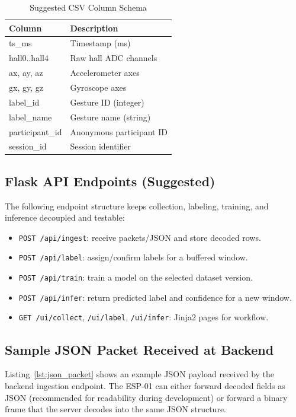 \documentclass[conference]{IEEEtran}
\begin{document}
\begin{table}[htbp]
    \centering
    \caption{Suggested CSV Column Schema}
    \label{tab:csvschema}
    \begin{tabularx}{\columnwidth}{@{}lX@{}}
        \toprule
        Column & Description \\
        \midrule
        ts\_ms & Timestamp (ms) \\
        hall0..hall4 & Raw hall ADC channels \\
        ax, ay, az & Accelerometer axes \\
        gx, gy, gz & Gyroscope axes \\
        label\_id & Gesture ID (integer) \\
        label\_name & Gesture name (string) \\
        participant\_id & Anonymous participant ID \\
        session\_id & Session identifier \\
        \bottomrule
    \end{tabularx}
\end{table}

\subsection{Flask API Endpoints (Suggested)}
The following endpoint structure keeps collection, labeling, training, and inference decoupled and testable:
\begin{itemize}[noitemsep]
    \item \texttt{POST /api/ingest}: receive packets/JSON and store decoded rows.
    \item \texttt{POST /api/label}: assign/confirm labels for a buffered window.
    \item \texttt{POST /api/train}: train a model on the selected dataset version.
    \item \texttt{POST /api/infer}: return predicted label and confidence for a new window.
    \item \texttt{GET /ui/collect}, \texttt{/ui/label}, \texttt{/ui/infer}: Jinja2 pages for workflow.
\end{itemize}

\subsection{Sample JSON Packet Received at Backend}
Listing~\ref{lst:json_packet} shows an example JSON payload received by the backend ingestion endpoint. The ESP-01 can either forward decoded fields as JSON (recommended for readability during development) or forward a binary frame that the server decodes into the same JSON structure.
\end{document}
